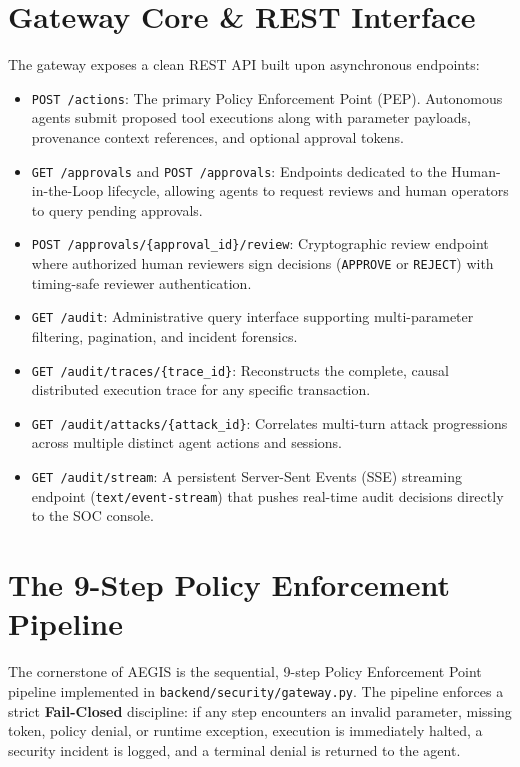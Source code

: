 \section{Gateway Core \& REST Interface}
The gateway exposes a clean REST API built upon asynchronous endpoints:
\begin{itemize}
    \item \texttt{POST /actions}: The primary Policy Enforcement Point (PEP). Autonomous agents submit proposed tool executions along with parameter payloads, provenance context references, and optional approval tokens.
    \item \texttt{GET /approvals} and \texttt{POST /approvals}: Endpoints dedicated to the Human-in-the-Loop lifecycle, allowing agents to request reviews and human operators to query pending approvals.
    \item \texttt{POST /approvals/\{approval\_id\}/review}: Cryptographic review endpoint where authorized human reviewers sign decisions (\texttt{APPROVE} or \texttt{REJECT}) with timing-safe reviewer authentication.
    \item \texttt{GET /audit}: Administrative query interface supporting multi-parameter filtering, pagination, and incident forensics.
    \item \texttt{GET /audit/traces/\{trace\_id\}}: Reconstructs the complete, causal distributed execution trace for any specific transaction.
    \item \texttt{GET /audit/attacks/\{attack\_id\}}: Correlates multi-turn attack progressions across multiple distinct agent actions and sessions.
    \item \texttt{GET /audit/stream}: A persistent Server-Sent Events (SSE) streaming endpoint (\texttt{text/event-stream}) that pushes real-time audit decisions directly to the SOC console.
\end{itemize}

\section{The 9-Step Policy Enforcement Pipeline}
The cornerstone of AEGIS is the sequential, 9-step Policy Enforcement Point pipeline implemented in \texttt{backend/security/gateway.py}. The pipeline enforces a strict \textbf{Fail-Closed} discipline: if any step encounters an invalid parameter, missing token, policy denial, or runtime exception, execution is immediately halted, a security incident is logged, and a terminal denial is returned to the agent.

